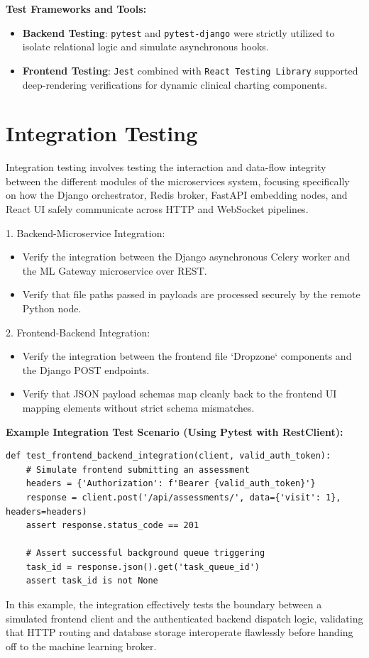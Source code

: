 \documentclass{fisatprojectfinal}
\begin{document}
\textbf{Test Frameworks and Tools:}
\begin{itemize}
    \item \textbf{Backend Testing}: \texttt{pytest} and \texttt{pytest-django} were strictly utilized to isolate relational logic and simulate asynchronous hooks.
    \item \textbf{Frontend Testing}: \texttt{Jest} combined with \texttt{React Testing Library} supported deep-rendering verifications for dynamic clinical charting components.
\end{itemize}

\section{Integration Testing}
Integration testing involves testing the interaction and data-flow integrity between the different modules of the microservices system, focusing specifically on how the Django orchestrator, Redis broker, FastAPI embedding nodes, and React UI safely communicate across HTTP and WebSocket pipelines.

1. Backend-Microservice Integration:
\begin{itemize}
    \item Verify the integration between the Django asynchronous Celery worker and the ML Gateway microservice over REST.
    \item Verify that file paths passed in payloads are processed securely by the remote Python node.
\end{itemize}

2. Frontend-Backend Integration:
\begin{itemize}
    \item Verify the integration between the frontend file `Dropzone` components and the Django POST endpoints.
    \item Verify that JSON payload schemas map cleanly back to the frontend UI mapping elements without strict schema mismatches.
\end{itemize}

\textbf{Example Integration Test Scenario (Using Pytest with RestClient):}
\begin{verbatim}
def test_frontend_backend_integration(client, valid_auth_token):
    # Simulate frontend submitting an assessment
    headers = {'Authorization': f'Bearer {valid_auth_token}'}
    response = client.post('/api/assessments/', data={'visit': 1}, headers=headers)
    assert response.status_code == 201
    
    # Assert successful background queue triggering
    task_id = response.json().get('task_queue_id')
    assert task_id is not None
\end{verbatim}
In this example, the integration effectively tests the boundary between a simulated frontend client and the authenticated backend dispatch logic, validating that HTTP routing and database storage interoperate flawlessly before handing off to the machine learning broker.
\end{document}
